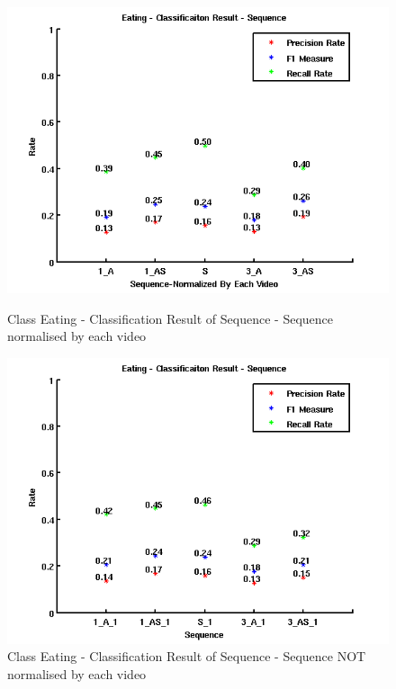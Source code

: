 \begin{figure}[ht]
\centering
\begin{minipage}{.5\textwidth}
  \centering
  \captionsetup{justification=centering, margin=1cm}
  \includegraphics[width=\linewidth]{imgs/Result_Eating_Sequence.png}
  \caption{Class Eating - Classification Result of Sequence - Sequence normalised by each video}
  \label{fig:RES}
\end{minipage}%
\begin{minipage}{.5\textwidth}
  \centering
  \captionsetup{justification=centering, margin=1cm}
  \includegraphics[width=\linewidth]{imgs/Result_Eating_Sequence_1.png}
  \caption{Class Eating - Classification Result of Sequence - Sequence NOT normalised by each video}
  \label{fig:RES1}
\end{minipage}
\end{figure}
